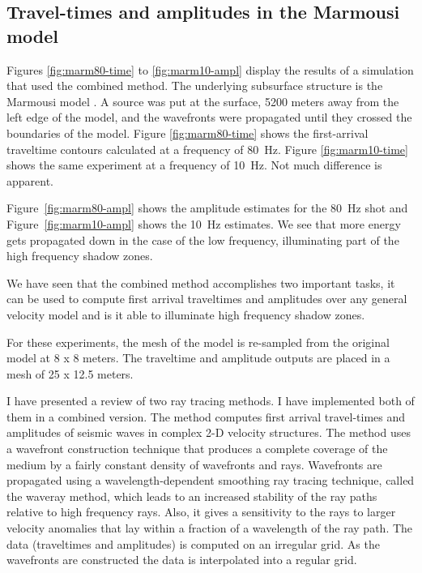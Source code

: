 \subsection{Travel-times and amplitudes in the Marmousi model}

Figures \ref{fig:marm80-time} to \ref{fig:marm10-ampl} display 
the results of a simulation that used the combined 
method. The underlying subsurface structure is the 
Marmousi model \cite[]{Versteeg}.
A source was put at the surface, 5200 meters away from the left edge
of the model, and the wavefronts were
propagated until they crossed the boundaries of the model.
Figure \ref{fig:marm80-time}
shows the first-arrival traveltime contours calculated at a frequency
of 80~Hz. Figure \ref{fig:marm10-time} shows the same experiment at
a frequency of 10~Hz. Not much difference is apparent.

Figure~\ref{fig:marm80-ampl} shows the amplitude estimates for the 80~Hz
shot and Figure~\ref{fig:marm10-ampl} shows the 10~Hz estimates. We see
that more energy gets propagated down in the case of the low
frequency, illuminating part of the high frequency shadow zones.

We have seen that the combined method accomplishes two important tasks,
it can be used to compute first arrival traveltimes and amplitudes 
over any general velocity model and is it able to illuminate high
frequency shadow zones.

For these experiments, the mesh of the model is re-sampled
from the original model at 8 x 8 meters. The traveltime
and amplitude outputs are placed in a mesh of 25 x 12.5 meters.

\CON

I have presented a review of two ray tracing methods. I have 
implemented both of them in a combined version. The method 
computes first arrival travel-times and amplitudes of seismic 
waves in complex \mbox{2-D} velocity structures. 
The method uses a wavefront construction technique that produces
a complete coverage of the medium by a fairly
constant density of wavefronts and rays. Wavefronts are 
propagated using a wavelength-dependent smoothing ray tracing
technique, called the waveray method, which leads to an increased 
stability of the ray paths
relative to high frequency rays. Also, it gives a sensitivity to
the rays to larger velocity anomalies that lay within a fraction
of a wavelength of the ray path. The data (traveltimes and amplitudes)
is computed on an irregular grid. As the wavefronts are constructed 
the data is interpolated into a regular grid.


